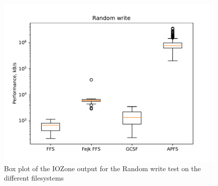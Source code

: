 \begin{figure}[!htb]
	\label{fig:res_box_rndwrite}
	\begin{center}
		\includegraphics[width=1.0\textwidth]{figures/benchmarking/Random write_box.pdf}
	\end{center}
	\caption{Box plot of the IOZone output for the Random write test on the different filesystems}
\end{figure}